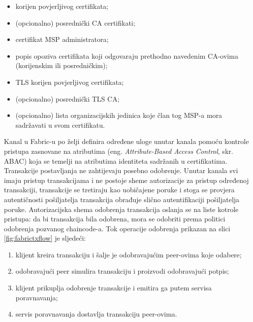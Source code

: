 \documentclass[times, utf8, diplomski]{fer}
\begin{document}
\begin{itemize}

\item korijen povjerljivog certifikata;

\item (opcionalno) posrednički CA certifikati;

\item certifikat MSP administratora;

\item popis opoziva certifikata koji odgovaraju prethodno navedenim CA-ovima (korijenskim ili posredničkim);

\item TLS korijen povjerljivog certifikata;

\item (opcionalno) posrednički TLS CA;

\item (opcionalno) lista organizacijskih jedinica koje član tog MSP-a mora sadržavati u svom certifikatu.

\end{itemize}

Kanal u Fabric-u po želji definira određene uloge unutar kanala pomoću kontrole pristupa zasnovane na atributima (eng. \textit{Attribute-Based Access Control}, skr. ABAC) koja se temelji na atributima identiteta sadržanih u certifikatima. Transakcije postavljanja ne zahtijevaju posebno odobrenje. Unutar kanala svi imaju pristup transakcijama i ne postoje sheme autorizacije za pristup određenoj transakciji, transakcije se tretiraju kao uobičajene poruke i stoga se provjera autentičnosti pošiljatelja transakcija obrađuje slično autentifikaciji pošiljatelja poruke. Autorizacijska shema odobrenja transakcija oslanja se na liste kotrole pristupa: da bi transakcija bila odobrena, mora se odobriti prema politici odobrenja pozvanog chaincode-a. Tok operacije odobrenja prikazan na slici \ref{fig:fabrictxflow} je sljedeći:

\begin{enumerate}

\item klijent kreira transakciju i šalje je odobravajućim peer-ovima koje odabere;

\item odobravajući peer simulira transakciju i proizvodi odobravajući potpis;

\item klijent prikuplja odobrenje transakcije i emitira ga putem servisa poravnavanja;

\item servis poravnavanja dostavlja transakciju peer-ovima.

\end{enumerate}
\end{document}
